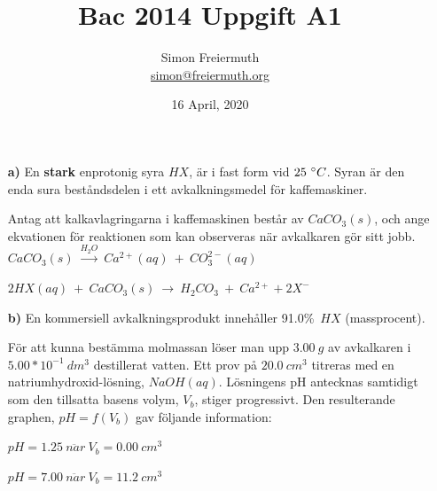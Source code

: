 \documentclass[12pt, letterpaper, twoside]{article}
\title{Bac 2014 Uppgift A1}
\author{Simon Freiermuth \\ \href{mailto:simon@freiermuth.org}{simon@freiermuth.org}}
\date{16 April, 2020}
\begin{document}
\begin{titlepage}
\maketitle
\end{titlepage}

\begin{flushleft}

\begin{itemize}
%
\item[\textbf{a)}]En \textbf{stark} enprotonig syra $ HX $, är i fast form vid $ 25\ \degree C $.
Syran är den enda sura beståndsdelen i ett avkalkningsmedel för kaffemaskiner.

Antag att kalkavlagringarna i kaffemaskinen består av $ CaCO_3(s) $,
och ange ekvationen för reaktionen som kan observeras när avkalkaren gör sitt jobb.
\newline
\newline
$ CaCO_3(s)\ \overset{H_2O}{\rightarrow}\ Ca^{2+}(aq)\ +\ CO_3^{2-}(aq) $

$ 2HX(aq)\ +\ CaCO_3(s)\ \rightarrow\ H_2CO_3\ +\ Ca^{2+} + 2X^- $
\newline
\item[\textbf{b)}]En kommersiell avkalkningsprodukt innehåller 91.0\%\ $ HX $ (massprocent).

För att kunna bestämma molmassan löser man upp $ 3.00\ g $ av avkalkaren i $ 5.00*10^{-1}\ dm^3 $ destillerat vatten.
Ett prov på $ 20.0\ cm^3 $ titreras med en natriumhydroxid-lösning,
$ NaOH(aq) $. Lösningens pH antecknas samtidigt som den tillsatta basens volym, $ V_b $, stiger progressivt.
\newline
\newline
Den resulterande graphen, $ pH=f(V_b) $ gav följande information:\\
\begin{addmargin}[1em]{2em}%
    $ pH = 1.25\ n\ddot{a}r\ V_b = 0.00\ cm^3 $

    $ pH = 7.00\ n\ddot{a}r\ V_b = 11.2\ cm^3 $


\end{addmargin}
\end{itemize}
\end{flushleft}
\end{document}
